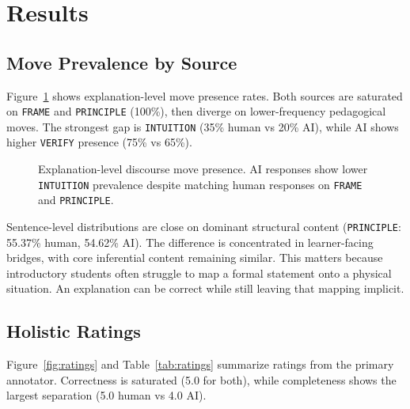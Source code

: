 \documentclass{article}
\begin{document}
\section{Results}
\subsection{Move Prevalence by Source}
Figure~\ref{fig:move-presence} shows explanation-level move presence rates. Both sources are saturated on \texttt{FRAME} and \texttt{PRINCIPLE} (100\%), then diverge on lower-frequency pedagogical moves. The strongest gap is \texttt{INTUITION} (35\% human vs 20\% AI), while AI shows higher \texttt{VERIFY} presence (75\% vs 65\%).

\begin{figure}[t]
\centering
{}
\caption{Explanation-level discourse move presence. AI responses show lower \texttt{INTUITION} prevalence despite matching human responses on \texttt{FRAME} and \texttt{PRINCIPLE}.}
\label{fig:move-presence}
\vspace{-0.9em}
\end{figure}

Sentence-level distributions are close on dominant structural content (\texttt{PRINCIPLE}: 55.37\% human, 54.62\% AI). The difference is concentrated in learner-facing bridges, with core inferential content remaining similar. This matters because introductory students often struggle to map a formal statement onto a physical situation. An explanation can be correct while still leaving that mapping implicit.

\subsection{Holistic Ratings}
Figure~\ref{fig:ratings} and Table~\ref{tab:ratings} summarize ratings from the primary annotator. Correctness is saturated (5.0 for both), while completeness shows the largest separation (5.0 human vs 4.0 AI).
\end{document}
